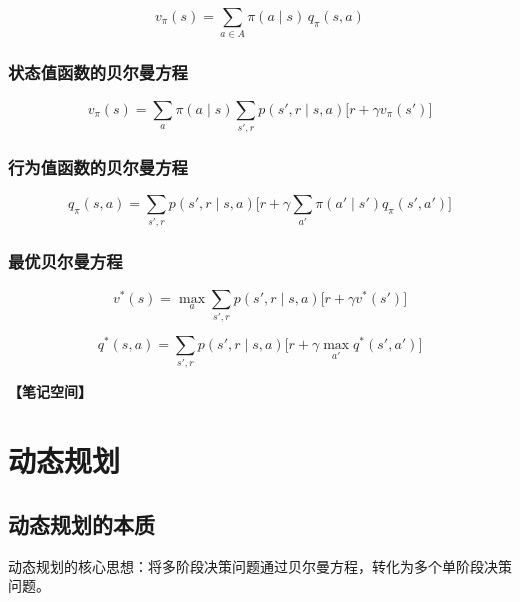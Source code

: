 \documentclass[12pt,a4paper]{article}
\newcommand{\notespace}[1][3cm]{%
  \vspace{#1}%
  \noindent\textbf{【笔记空间】}%
  \vspace{#1}%
}
\newcommand{\1}{\mathbf{1}}
\begin{document}
\begin{equation}
v_\pi(s)=\sum_{a\in A}\pi(a\mid s)\,q_\pi(s,a)
\end{equation}

\subsubsection*{状态值函数的贝尔曼方程}

\begin{equation}
v_\pi(s)=\sum_a \pi(a\mid s)\sum_{s',r} p(s',r\mid s,a)\bigl[r+\gamma v_\pi(s')\bigr]
\end{equation}

\subsubsection*{行为值函数的贝尔曼方程}

\begin{equation}
q_\pi(s,a)=\sum_{s',r} p(s',r\mid s,a)\bigl[r+\gamma \sum_{a'}\pi(a'\mid s')q_\pi(s',a')\bigr]
\end{equation}

\subsubsection*{最优贝尔曼方程}

\begin{equation}
v^*(s)=\max_a \sum_{s',r} p(s',r\mid s,a)\bigl[r+\gamma v^*(s')\bigr]
\end{equation}

\begin{equation}
q^*(s,a)=\sum_{s',r} p(s',r\mid s,a)\bigl[r+\gamma \max_{a'} q^*(s',a')\bigr]
\end{equation}

\notespace[3cm]

\newpage

\section{动态规划}

\subsection{动态规划的本质}

\begin{keybox}
动态规划的核心思想：将多阶段决策问题通过贝尔曼方程，转化为多个单阶段决策问题。
\end{keybox}
\end{document}

